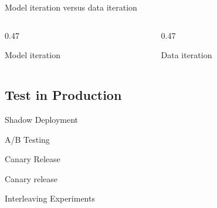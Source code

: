 \begin{frame}{Model iteration versus data iteration}
  \begin{columns}[T,onlytextwidth]
    \begin{column}{0.47\textwidth}
      \begin{tdblockt}[equal height group=iter]{Model iteration}
      \end{tdblockt}
    \end{column}
    \begin{column}{0.47\textwidth}
      \begin{tdblockt}[equal height group=iter]{Data iteration}
      \end{tdblockt}
    \end{column}
  \end{columns}
\end{frame}

\subsection{Test in Production}

\begin{frame}{Shadow Deployment}
  \begin{sidebody}
  \end{sidebody}
\end{frame}

\begin{frame}{A/B Testing}
  \begin{withmargin}
    \begin{tdmain}
    \end{tdmain}
    \begin{tdmargin}
    \end{tdmargin}
  \end{withmargin}
\end{frame}

\begin{frame}{Canary Release}
  \begin{tddef}{Canary release}
  \end{tddef}
\end{frame}

\begin{frame}{Interleaving Experiments}
  \begin{withmargin}
    \begin{tdmain}
    \end{tdmain}
    \begin{tdmargin}
    \end{tdmargin}
  \end{withmargin}
\end{frame}

